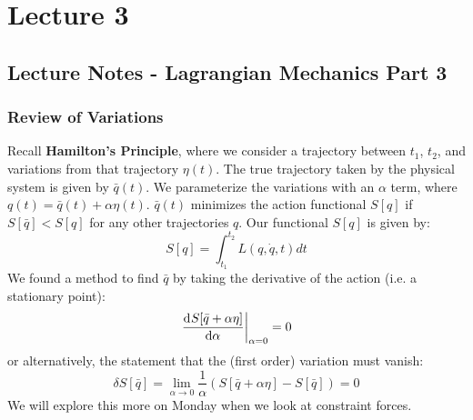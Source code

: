 \section{Lecture 3}
\subsection{Lecture Notes - Lagrangian Mechanics Part 3}
\subsubsection{Review of Variations}
Recall \textbf{Hamilton's Principle}, where we consider a trajectory between $t_1$, $t_2$, and variations from that trajectory $\eta(t)$. The true trajectory taken by the physical system is given by $\bar{q}(t)$. We parameterize the variations with an $\alpha$ term, where $q(t) = \bar{q}(t) + \alpha\eta(t)$. $\bar{q}(t)$ minimizes the action functional $S[q]$ if $S[\bar{q}] < S[q]$ for any other trajectories $q$. Our functional $S[q]$ is given by:
\[S[q] = \int_{t_1}^{t_2}
L(q, \dot{q}, t)dt\]
We found a method to find $\bar{q}$ by taking the derivative of the action (i.e. a stationary point):
\[\left. \dod{S[\bar{q} + \alpha \eta]}{\alpha}\right|_{\alpha = 0} = 0\]
or alternatively, the statement that the (first order) variation must vanish:
\[\delta S[\bar{q}] = \lim_{\alpha \rightarrow 0} \frac{1}{\alpha}\left(S[\bar{q} + \alpha\eta] - S[\bar{q}]\right) = 0\]
We will explore this more on Monday when we look at constraint forces. 

